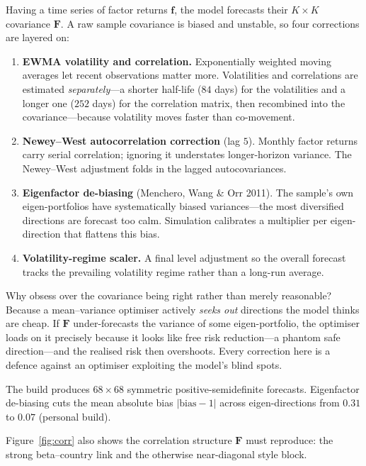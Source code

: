 \documentclass[11pt]{article}
\theoremstyle{definition}
\theoremstyle{plain}
\theoremstyle{remark}
\newcommand{\Fmat}{\mathbf{F}}
\newcommand{\fvec}{\mathbf{f}}
\begin{document}
Having a time series of factor returns $\fvec$, the model forecasts their $K\times K$ covariance $\Fmat$. A raw sample covariance is biased and unstable, so four corrections are layered on:
\begin{enumerate}[leftmargin=1.6em,nosep]
  \item \textbf{EWMA volatility and correlation.} Exponentially weighted moving averages let recent observations matter more. Volatilities and correlations are estimated \emph{separately}---a shorter half-life ($84$ days) for the volatilities and a longer one ($252$ days) for the correlation matrix, then recombined into the covariance---because volatility moves faster than co-movement.
  \item \textbf{Newey--West autocorrelation correction} (lag $5$). Monthly factor returns carry serial correlation; ignoring it understates longer-horizon variance. The Newey--West adjustment folds in the lagged autocovariances.
  \item \textbf{Eigenfactor de-biasing} (Menchero, Wang \& Orr 2011). The sample's own eigen-portfolios have systematically biased variances---the most diversified directions are forecast too calm. Simulation calibrates a multiplier per eigen-direction that flattens this bias.
  \item \textbf{Volatility-regime scaler.} A final level adjustment so the overall forecast tracks the prevailing volatility regime rather than a long-run average.
\end{enumerate}

\begin{intuition}
Why obsess over the covariance being right rather than merely reasonable? Because a mean--variance optimiser actively \emph{seeks out} directions the model thinks are cheap. If $\Fmat$ under-forecasts the variance of some eigen-portfolio, the optimiser loads on it precisely because it looks like free risk reduction---a phantom safe direction---and the realised risk then overshoots. Every correction here is a defence against an optimiser exploiting the model's blind spots.
\end{intuition}

\begin{observed}
The build produces $68\times 68$ symmetric positive-semidefinite forecasts. Eigenfactor de-biasing cuts the mean absolute bias $|{\text{bias}}-1|$ across eigen-directions from $0.31$ to $0.07$ (personal build).
\end{observed}

Figure~\ref{fig:corr} also shows the correlation structure $\Fmat$ must reproduce: the strong beta--country link and the otherwise near-diagonal style block.
\end{document}
